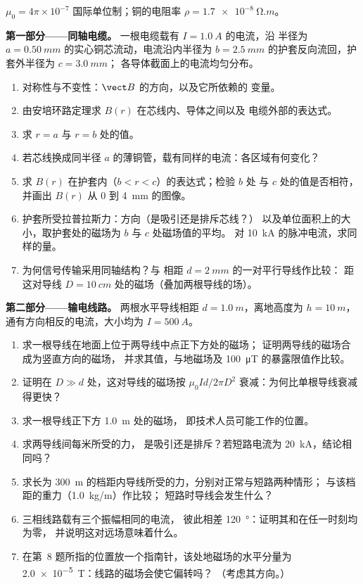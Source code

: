 \begin{problem}
\label{pb:b1:magnetostatics:1}
$\mu_0 = 4\pi \times 10^{-7}$ 国际单位制；铜的电阻率 $\rho = \qty{1.7e-8}{\ohm.m}$。

\medskip
\noindent\textbf{第一部分——同轴电缆。}
一根电缆载有 $I = \qty{1.0}{A}$ 的电流，沿
半径为 $a = \qty{0.50}{mm}$ 的实心铜芯流动，电流沿内半径为 $b =
\qty{2.5}{mm}$ 的护套反向流回，护套外半径为 $c = \qty{3.0}{mm}$；
各导体截面上的电流均匀分布。
\begin{enumerate}
  \item 对称性与不变性：$\vect B$ 的方向，以及它所依赖的
        变量。
  \item 由安培环路定理求 $B(r)$ 在芯线内、导体之间以及
        电缆外部的表达式。
  \item 求 $r = a$ 与 $r = b$ 处的值。
  \item 若芯线换成同半径
        $a$ 的薄铜管，载有同样的电流：各区域有何变化？
  \item 求 $B(r)$ 在护套内（$b < r < c$）的表达式；检验 $b$ 处
        与 $c$ 处的值是否相符，并画出 $B(r)$ 从 $0$ 到 \qty{4}{mm} 的图像。
  \item 护套所受拉普拉斯力：方向（是吸引还是排斥芯线？）
        以及单位面积上的大小，取护套处的磁场为
        $b$ 与 $c$ 处磁场值的平均。
        对 \qty{10}{kA} 的脉冲电流，求同样的量。
  \item 为何信号传输采用同轴结构？与
        相距 $d = \qty{2}{mm}$ 的一对平行导线作比较：
        距这对导线 $D = \qty{10}{cm}$ 处的磁场（叠加两根导线的场）。
\end{enumerate}

\medskip
\noindent\textbf{第二部分——输电线路。}
两根水平导线相距 $d = \qty{1.0}{m}$，离地高度为 $h = \qty{10}{m}$，
通有方向相反的电流，大小均为 $I = \qty{500}{A}$。
\begin{enumerate}[resume]
  \item 求一根导线在地面上位于两导线中点正下方处的磁场；
        证明两导线的磁场合成为竖直方向的磁场，
        并求其值，与地磁场及
        \qty{100}{\micro T} 的暴露限值作比较。
  \item 证明在 $D \gg d$ 处，这对导线的磁场按
        $\mu_0Id/2\pi D^2$ 衰减：为何比单根导线衰减得更快？
  \item 求一根导线正下方 \qty{1.0}{m} 处的磁场，
        即技术人员可能工作的位置。
  \item 求两导线间每米所受的力，
        是吸引还是排斥？若短路电流为 \qty{20}{kA}，结论相同吗？
  \item 求长为 \qty{300}{m} 的档距内导线所受的力，分别对正常与短路两种情形；
        与该档距的重力（\qty{1.0}{kg/m}）作比较；
        短路时导线会发生什么？
  \item 三相线路载有三个振幅相同的电流，
        彼此相差 \qty{120}{\degree}：证明其和在任一时刻均为零，
        并说明这对远场意味着什么。
  \item 在第~8 题所指的位置放一个指南针，该处地磁场的水平分量为
        \qty{2.0e-5}{T}：线路的磁场会使它偏转吗？
        （考虑其方向。）
\end{enumerate}


\end{problem}

